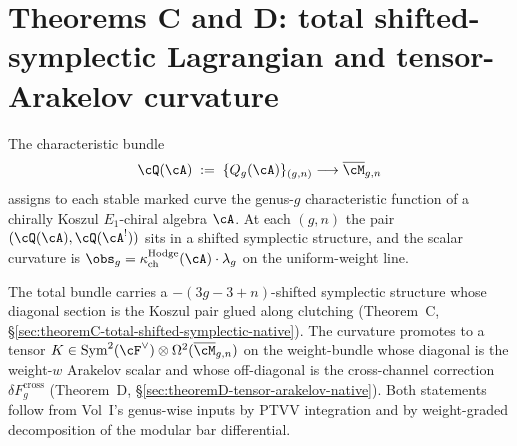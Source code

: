 %
%

\chapter{Theorems C and D: total shifted-symplectic Lagrangian and
tensor-Arakelov curvature}
\label{chap:theorems-C-D-native}

\providecommand{\ClaimStatusProvedHere}{\textsc{ProvedHere}}
\providecommand{\ClaimStatusProvedElsewhere}{\textsc{ProvedElsewhere}}
\providecommand{\ClaimStatusConjectured}{\textsc{Conjectured}}
\providecommand{\ClaimStatusRetracted}{\textsc{Retracted}}

\providecommand{\kappaCat}{\kappa_{\mathrm{cat}}}
\providecommand{\kappaChHodge}{\kappa_{\mathrm{ch}}^{\mathrm{Hodge}}}
\providecommand{\kappaChHeis}{\kappa_{\mathrm{ch}}^{\mathrm{Heis}}}
\providecommand{\kappaBKM}{\kappa_{\mathrm{BKM}}}
\providecommand{\kappaFiber}{\kappa_{\mathrm{fiber}}}
\providecommand{\Kkappa}{K^{\kappaChHodge}}
\providecommand{\kappaTuple}[1]{\bigl(\kappaCat,\, \kappaChHodge,\, \kappaChHeis,\, \kappaBKM,\, \kappaFiber\bigr)(#1)}
\providecommand{\Deltafive}{\Delta_{5}}
\providecommand{\Phihol}{\Phi_{\mathrm{hol}}}

The characteristic bundle
\[
 \cQ(\cA) \;:=\; \{Q_g(\cA)\}_{(g,n)} \longrightarrow
 \overline{\cM}_{g,n}
\]
assigns to each stable marked curve the genus-$g$ characteristic
function of a chirally Koszul $E_1$-chiral algebra $\cA$. At each
$(g,n)$ the pair $(\cQ(\cA), \cQ(\cA^!))$ sits in a shifted
symplectic structure, and the scalar curvature is
$\obs_g = \kappaChHodge(\cA) \cdot \lambda_g$ on the uniform-weight
line.

The total bundle carries a $-(3g{-}3{+}n)$-shifted symplectic
structure whose diagonal section is the Koszul pair glued along
clutching (Theorem~C,
\S\ref{sec:theoremC-total-shifted-symplectic-native}). The
curvature promotes to a tensor
$K \in \operatorname{Sym}^2(\cF^\vee) \otimes \Omega^2(\overline{\cM}_{g,n})$
on the weight-bundle whose diagonal is the weight-$w$ Arakelov
scalar and whose off-diagonal is the cross-channel correction
$\delta F_g^{\mathrm{cross}}$ (Theorem~D,
\S\ref{sec:theoremD-tensor-arakelov-native}). Both statements
follow from Vol~I's genus-wise inputs by PTVV integration and by
weight-graded decomposition of the modular bar differential.

